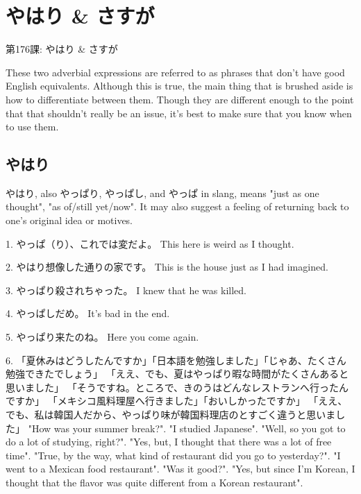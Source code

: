     
\chapter{やはり \& さすが}

\begin{center}
\begin{Large}
第176課: やはり \& さすが 
\end{Large}
\end{center}
 
\par{ These two adverbial expressions are referred to as phrases that don't have good English equivalents. Although this is true, the main thing that is brushed aside is how to differentiate between them. Though they are different enough to the point that that shouldn't really be an issue, it's best to make sure that you know when to use them. }
      
\section{やはり}
 
\par{ やはり, also やっぱり, やっぱし, and やっぱ in slang, means "just as one thought", "as of\slash still yet\slash now". It may also suggest a feeling of returning back to one's original idea or motives. }

\par{1. やっぱ（り）、これでは変だよ。 \hfill\break
This here is weird as I thought. }

\par{2. やはり想像した通りの家です。 \hfill\break
This is the house just as I had imagined. }

\par{3. やっぱり殺されちゃった。 \hfill\break
I knew that he was killed. }

\par{4. やっぱしだめ。 \hfill\break
It's bad in the end. }

\par{5. やっぱり来たのね。 \hfill\break
Here you come again. }

\par{6. 「夏休みはどうしたんですか」「日本語を勉強しました」「じゃあ、たくさん勉強できたでしょう」 \hfill\break
「ええ、でも、夏はやっぱり暇な時間がたくさんあると思いました」 \hfill\break
「そうですね。ところで、きのうはどんなレストランへ行ったんですか」 \hfill\break
「メキシコ風料理屋へ行きました」「おいしかったですか」 \hfill\break
「ええ、でも、私は韓国人だから、やっぱり味が韓国料理店のとすごく違うと思いました」 \hfill\break
"How was your summer break?". "I studied Japanese". "Well, so you got to do a lot of studying, right?". "Yes, but, I thought that there was a lot of free time". "True, by the way, what kind of restaurant did you go to yesterday?". "I went to a Mexican food restaurant". "Was it good?". "Yes, but since I'm Korean, I thought that the flavor was quite different from a Korean restaurant". }
      
